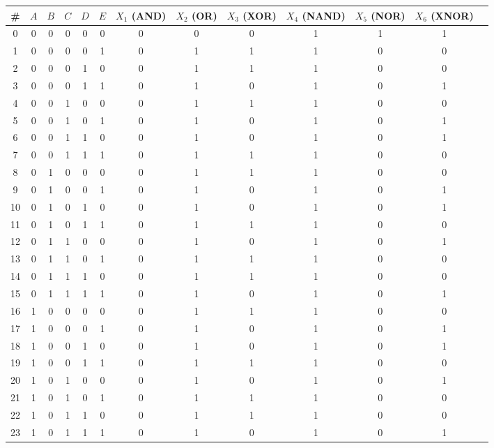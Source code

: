 \documentclass[11pt]{article}
\begin{document}
	\begin{table}[H]
	    \centering
	    \begin{tabular}{|c|c|c|c|c|c|c|c|c|c|c|c|c|}
	         \hline
	         \# & $A$ & $B$ & $C$ & $D$ & $E$ & $X_1$ (AND) & $X_2$ (OR) & $X_3$ (XOR) & $X_4$ (NAND) & $X_5$ (NOR) & $X_6$ (XNOR) \\ \hline
0 & 0 & 0 & 0 & 0 & 0 & 0 & 0 & 0 & 1 & 1 & 1 \\ \hline
1 & 0 & 0 & 0 & 0 & 1 & 0 & 1 & 1 & 1 & 0 & 0 \\ \hline
2 & 0 & 0 & 0 & 1 & 0 & 0 & 1 & 1 & 1 & 0 & 0 \\ \hline
3 & 0 & 0 & 0 & 1 & 1 & 0 & 1 & 0 & 1 & 0 & 1 \\ \hline
4 & 0 & 0 & 1 & 0 & 0 & 0 & 1 & 1 & 1 & 0 & 0 \\ \hline
5 & 0 & 0 & 1 & 0 & 1 & 0 & 1 & 0 & 1 & 0 & 1 \\ \hline
6 & 0 & 0 & 1 & 1 & 0 & 0 & 1 & 0 & 1 & 0 & 1 \\ \hline
7 & 0 & 0 & 1 & 1 & 1 & 0 & 1 & 1 & 1 & 0 & 0 \\ \hline
8 & 0 & 1 & 0 & 0 & 0 & 0 & 1 & 1 & 1 & 0 & 0 \\ \hline
9 & 0 & 1 & 0 & 0 & 1 & 0 & 1 & 0 & 1 & 0 & 1 \\ \hline
10 & 0 & 1 & 0 & 1 & 0 & 0 & 1 & 0 & 1 & 0 & 1 \\ \hline
11 & 0 & 1 & 0 & 1 & 1 & 0 & 1 & 1 & 1 & 0 & 0 \\ \hline
12 & 0 & 1 & 1 & 0 & 0 & 0 & 1 & 0 & 1 & 0 & 1 \\ \hline
13 & 0 & 1 & 1 & 0 & 1 & 0 & 1 & 1 & 1 & 0 & 0 \\ \hline
14 & 0 & 1 & 1 & 1 & 0 & 0 & 1 & 1 & 1 & 0 & 0 \\ \hline
15 & 0 & 1 & 1 & 1 & 1 & 0 & 1 & 0 & 1 & 0 & 1 \\ \hline
16 & 1 & 0 & 0 & 0 & 0 & 0 & 1 & 1 & 1 & 0 & 0 \\ \hline
17 & 1 & 0 & 0 & 0 & 1 & 0 & 1 & 0 & 1 & 0 & 1 \\ \hline
18 & 1 & 0 & 0 & 1 & 0 & 0 & 1 & 0 & 1 & 0 & 1 \\ \hline
19 & 1 & 0 & 0 & 1 & 1 & 0 & 1 & 1 & 1 & 0 & 0 \\ \hline
20 & 1 & 0 & 1 & 0 & 0 & 0 & 1 & 0 & 1 & 0 & 1 \\ \hline
21 & 1 & 0 & 1 & 0 & 1 & 0 & 1 & 1 & 1 & 0 & 0 \\ \hline
22 & 1 & 0 & 1 & 1 & 0 & 0 & 1 & 1 & 1 & 0 & 0 \\ \hline
23 & 1 & 0 & 1 & 1 & 1 & 0 & 1 & 0 & 1 & 0 & 1 \\ \hline

\end{tabular}
\end{table}
\end{document}
